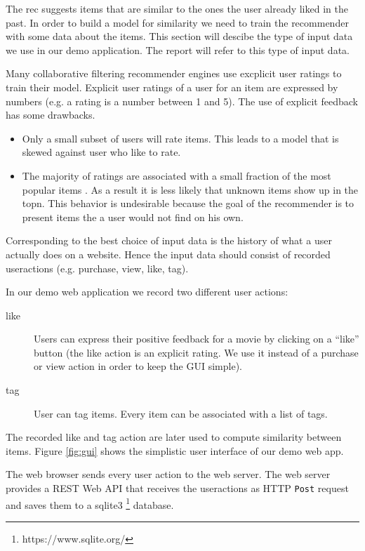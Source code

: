 The \gls{rec} suggests items that are similar to the ones the user already liked in the past. In order to build a model for similarity we need to train the recommender with some data about the items.
This section will descibe the type of input data we use  in our demo application. The report will refer to this type of input data. 

Many collaborative filtering recommender engines use excplicit user ratings to train their model. Explicit user ratings of a user for an item are expressed by numbers (e.g. a rating is a number between 1 and 5). The use of explicit feedback has some drawbacks.
\begin{itemize}
\item Only a small subset of users will rate items. This leads to a model that is skewed against user who like to rate.
\item The majority of ratings are associated with a small fraction of the most popular items \cite{Anderson}. As a result it is less likely that unknown items show up in the \gls{topn}. This behavior is undesirable because the goal of the recommender is to present items the a user would not find on his own.
\end{itemize}


Corresponding to \cite{Dunning14} the best choice of input data is the history of what a user actually does on a website. Hence the input data should consist of recorded \glspl{useraction} (e.g. purchase, view, like, tag).

In our demo web application we record two different user actions:
\begin{description}
\item[like]  Users can express their positive feedback for a movie by clicking on a ``like'' button (the \gls{like} action is an explicit rating. We use it instead of a purchase or view action in order to keep the GUI simple).
\item[tag] User can \gls{tag} items. Every item can be associated with a list of \glspl{tag}.
\end{description}
The recorded like and tag action are later used to compute similarity between items.
Figure \ref{fig:gui} shows the simplistic user interface of our demo web app.

The web browser sends every user action to the web server. The web server provides a REST Web API that receives the \glspl{useraction} as HTTP \verb|Post| request and saves them to a sqlite3 \footnote{https://www.sqlite.org/} database.

